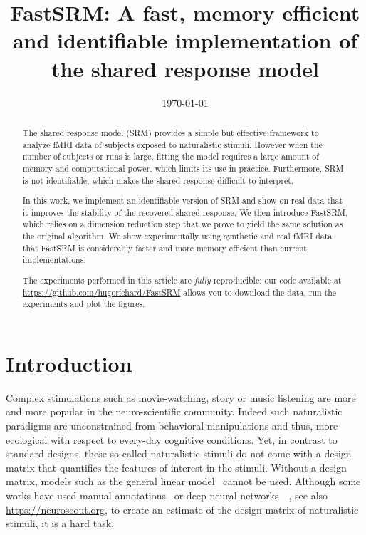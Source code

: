 \documentclass{article}
\title{FastSRM: A fast, memory efficient and identifiable implementation of the
  shared response model}
\date{\today} %
\newcommand{\bt}[1]{\todo[color=orange, inline=True]{BT: #1}}
\begin{document}
\maketitle

\begin{abstract}
  The shared response model (SRM) provides a simple but effective framework to analyze
  fMRI data of subjects exposed to naturalistic stimuli.
  However when the number
  of subjects or runs is large,
  fitting the model requires a large amount of memory
and computational power, which limits its use in practice.
%
Furthermore, SRM is
not identifiable, which makes the shared response difficult to interpret.


In this work, we implement an identifiable version of SRM and show on real data
that it improves the stability of the recovered shared response.
%
We then introduce FastSRM, which relies on a dimension reduction step that we
prove to yield the same solution as the original algorithm.
%
We show experimentally using synthetic and real fMRI data
that FastSRM is considerably faster and more memory efficient
than current implementations.


The experiments performed in this article are \emph{fully} reproducible: our
code available at \url{https://github.com/hugorichard/FastSRM} allows you to download the
data, run the experiments and plot the figures.
%

\end{abstract}

\section{Introduction}
%
Complex stimulations such as movie-watching, story or music listening are more
and more popular in the neuro-scientific community. Indeed such naturalistic
paradigms are unconstrained from behavioral manipulations and thus, more
ecological with respect to every-day cognitive conditions.
%
Yet, in contrast to standard designs, these so-called
naturalistic stimuli do not come with a design matrix that quantifies the
features of interest in the stimuli.
%
Without a design matrix, models such as the general linear
model~\cite{poline2012general} cannot be used.
%
Although some works have used manual
annotations~\cite{huth2012continuous} or deep neural
networks~\cite{gucclu2017increasingly}~\cite{richard2018optimizing},
see also \url{https://neuroscout.org}, to create an estimate of the
design matrix of naturalistic stimuli, it is a hard task.
\end{document}
